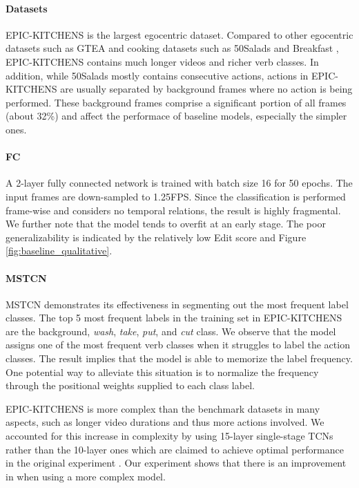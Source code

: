 \paragraph{Datasets} 
EPIC-KITCHENS is the largest egocentric dataset. Compared to other egocentric datasets such as GTEA \cite{5995444} and cooking datasets such as 50Salads \cite{10.1145/2493432.2493482} and Breakfast \cite{6909500}, EPIC-KITCHENS contains much longer videos and richer verb classes. In addition, while 50Salads  mostly contains consecutive actions, actions in EPIC-KITCHENS are usually separated by background frames where no action is being performed. These background frames comprise a significant portion of all frames (about 32\%) and affect the performace of baseline models, especially the simpler ones. 

\paragraph{FC}
A 2-layer fully connected network is trained with batch size 16 for 50 epochs. The input frames are down-sampled to 1.25FPS. Since the classification is performed frame-wise and considers no temporal relations, the result is highly fragmental. We further note that the model tends to overfit at an early stage. The poor generalizability is indicated by the relatively low Edit score and Figure \ref{fig:baseline_qualitative}. %

\paragraph{MSTCN} MSTCN demonstrates its effectiveness in segmenting out the most frequent label classes. The top 5 most frequent labels in the training set in EPIC-KITCHENS are the background, \emph{wash}, \emph{take}, \emph{put}, and \emph{cut} class. We observe that the model assigns one of the most frequent verb classes when it struggles to label the action classes. The result implies that the model is able to memorize the label frequency. One potential way to alleviate this situation is to normalize the frequency through the positional weights supplied to each class label.

EPIC-KITCHENS is more complex than the benchmark datasets in many aspects, such as longer video durations and thus more actions involved. We accounted for this increase in complexity by using 15-layer single-stage TCNs rather than the 10-layer ones which are claimed to achieve optimal performance in the original experiment \cite{8953830}. Our experiment shows that there is an improvement in when using a more complex model.

